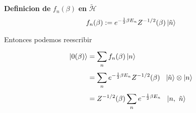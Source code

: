 \documentclass{article}
\begin{document}
\hfill 

\textbf{Definicion de }$ f_n(\beta)  $ \textbf{en }$ \tilde{\mathcal H } $
\begin{gather*}
  f_n(\beta) := e ^ {-\frac{1}{2} \beta E_n}Z ^ {-1/2 }(\beta) \ket{\tilde n } 
\end{gather*}

Entonces podemos reescribir 
\begin{align*}
  \ket{0(\beta)} &= \displaystyle\sum_{n }^{}f_n(\beta)\ket{n } \\
             &= \displaystyle\sum_{n }^{} e ^ {-\frac{1}{2} \beta E_n}Z ^ {-1/2 }(\beta)\ \ \ket{\tilde n } \otimes \ket{n }\\
             &= Z ^ {-1/2 }(\beta)\displaystyle\sum_{n }^{} e ^ {-\frac{1}{2} \beta E_n}\ \ \ket{n,\ \tilde n }
\end{align*}
\end{document}
